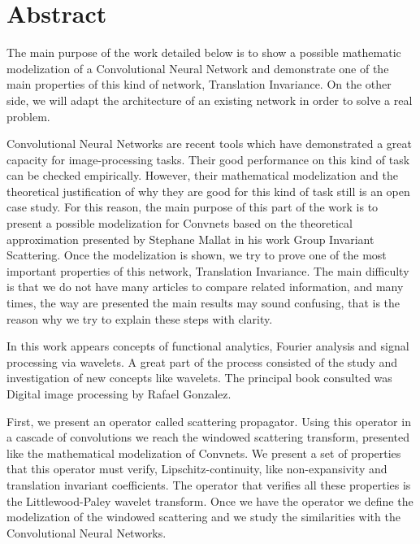 %

\chapter{Abstract}

\noindent The main purpose of the work detailed below is to show a possible mathematic modelization of a Convolutional Neural Network and demonstrate one of the main properties of this kind of network, Translation Invariance.  On the other side, we will adapt the architecture of an existing network in order to solve a real problem.

\medskip

\noindent Convolutional Neural Networks are recent tools which have demonstrated a great capacity for image-processing tasks. Their good performance on this kind of task can be checked empirically. However, their mathematical modelization and the theoretical justification of why they are good for this kind of task still is an open case study. For this reason, the main purpose of this part of the work is to present a possible modelization for Convnets based on the theoretical approximation presented by Stephane Mallat in his work Group Invariant Scattering. Once the modelization is shown, we try to prove one of the most important properties of this network, Translation Invariance. The main difficulty is that we do not have many articles to compare related information, and many times, the way are presented the main results may sound confusing, that is the reason why we try to explain these steps with clarity.

\medskip

\noindent In this work appears concepts of functional analytics, Fourier analysis and signal processing via wavelets.  A great part of the process consisted of the study and investigation of new concepts like wavelets. The principal book consulted was Digital image processing by Rafael Gonzalez.

\medskip

\noindent First, we present an operator called scattering propagator. Using this operator in a cascade of convolutions we reach the windowed scattering transform, presented like the mathematical modelization of Convnets. We present a set of properties that this operator must verify, Lipschitz-continuity, like non-expansivity and translation invariant coefficients. The operator that verifies all these properties is the Littlewood-Paley wavelet transform. Once we have the operator we define the modelization of the windowed scattering and we study the similarities with the Convolutional Neural Networks. 





\endinput

